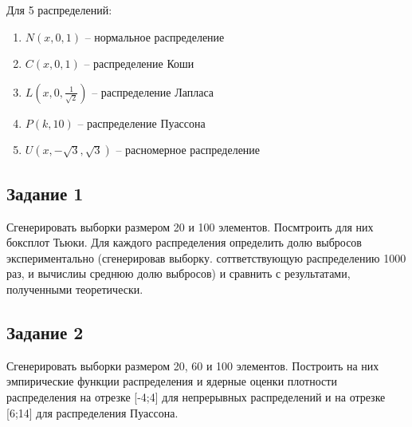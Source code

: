 Для 5 распределений:
\begin{enumerate}
	\item $N(x, 0, 1)$ -- нормальное распределение
	\item $C(x, 0, 1)$ -- распределение Коши
	\item $L(x, 0, \frac{1}{\sqrt{2}})$ -- распределение Лапласа 
	\item $P(k, 10)$ -- распределение Пуассона
	\item $U(x, -\sqrt{3}, \sqrt{3})$ -- расномерное распределение
\end{enumerate}

\subsection{Задание 1}
Сгенерировать выборки размером 20 и 100 элементов.
Посмтроить для них боксплот Тьюки.
Для каждого распределения определить долю выбросов экспериментально (сгенерировав выборку. соттветствующую распределению 1000 раз, и вычислиы среднюю долю выбросов) и сравнить с результатами, полученными теоретически.
\subsection{Задание 2}
Сгенерировать выборки размером 20, 60 и 100 элементов.
Построить на них эмпирические функции распределения и ядерные оценки плотности распределения на отрезке [-4;4] для непрерывных распределений и на отрезке [6;14] для распределения Пуассона.
